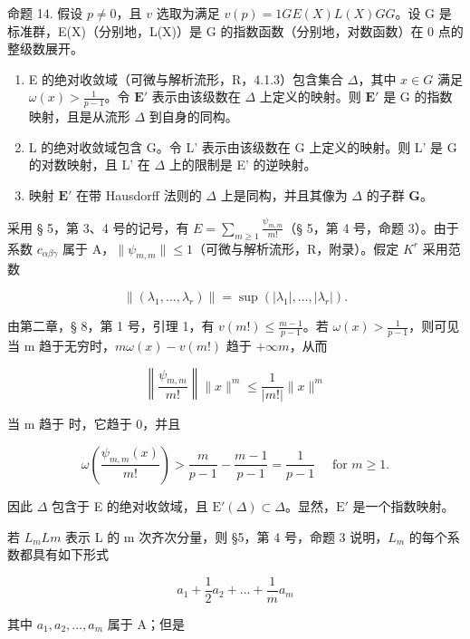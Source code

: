 命题 14. 假设 \(p \neq 0\)，且 \(v\) 选取为满足 \(v(p) = 1\)\(G\)\(E(X)\)\(L(X)\)\(G\)\(G\)。设 G 是标准群，E(X)（分别地，L(X)）是 G 的指数函数（分别地，对数函数）在 0 点的整级数展开。

\begin{enumerate}
\def\labelenumi{(\roman{enumi})}
\item
  E 的绝对收敛域（可微与解析流形，R，4.1.3）包含集合 \(\Delta\)，其中 \(x \in G\) 满足 \(\omega(x) > \frac{1}{p - 1}\)。令 \(\mathbf{E}'\) 表示由该级数在 \(\Delta\) 上定义的映射。则 \(\mathbf{E}'\) 是 G 的指数映射，且是从流形 \(\Delta\) 到自身的同构。
\item
  L 的绝对收敛域包含 G。令 L' 表示由该级数在 G 上定义的映射。则 L' 是 G 的对数映射，且 L' 在 \(\Delta\) 上的限制是 E' 的逆映射。
\item
  映射 \(\mathbf{E}'\) 在带 Hausdorff 法则的 \(\Delta\) 上是同构，并且其像为 \(\Delta\) 的子群 \(\mathbf{G}\)。
\end{enumerate}

采用 § 5，第 3、4 号的记号，有 \(E = \sum_{m \geqslant 1} \frac{\psi_{m,m}}{m!}\)（§ 5，第 4 号，命题 3）。由于系数 \(c_{\alpha\beta\gamma}\) 属于 A，\(\|\psi_{m,m}\| \leqslant 1\)（可微与解析流形，R，附录）。假定 \(K^{r}\) 采用范数

\[
\left\| \left(\lambda_ {1}, \dots , \lambda_ {r}\right) \right\| = \sup \left(\left| \lambda_ {1} \right|, \dots , \left| \lambda_ {r} \right|\right).
\]

由第二章，§ 8，第 1 号，引理 1，有 \(v(m!) \leqslant \frac{m - 1}{p - 1}\)。若 \(\omega(x) > \frac{1}{p - 1}\)，则可见当 m 趋于无穷时，\(m\omega(x) - v(m!)\) 趋于 \(+\infty\)\(m\)，从而

\[
\left\| \frac {\psi_ {m , m}}{m !} \right\| \| x \| ^ {m} \leqslant \frac {1}{| m ! |} \| x \| ^ {m}
\]

当 m 趋于  时，它趋于 0，并且

\[
\omega \left(\frac {\psi_ {m , m} (x)}{m !}\right) > \frac {m}{p - 1} - \frac {m - 1}{p - 1} = \frac {1}{p - 1} \quad \text { for } m \geqslant 1.
\]

因此 \(\Delta\) 包含于 E 的绝对收敛域，且 \(\mathrm{E}'(\Delta) \subset \Delta\)。显然，\(\mathrm{E}'\) 是一个指数映射。

若 \(L_{m}\)\(L\)\(m\) 表示 L 的 m 次齐次分量，则 §5，第 4 号，命题 3 说明，\(L_{m}\) 的每个系数都具有如下形式

\[
a _ {1} + \frac {1}{2} a _ {2} + \dots + \frac {1}{m} a _ {m}
\]

其中 \(a_1, a_2, \ldots, a_m\) 属于 A；但是

